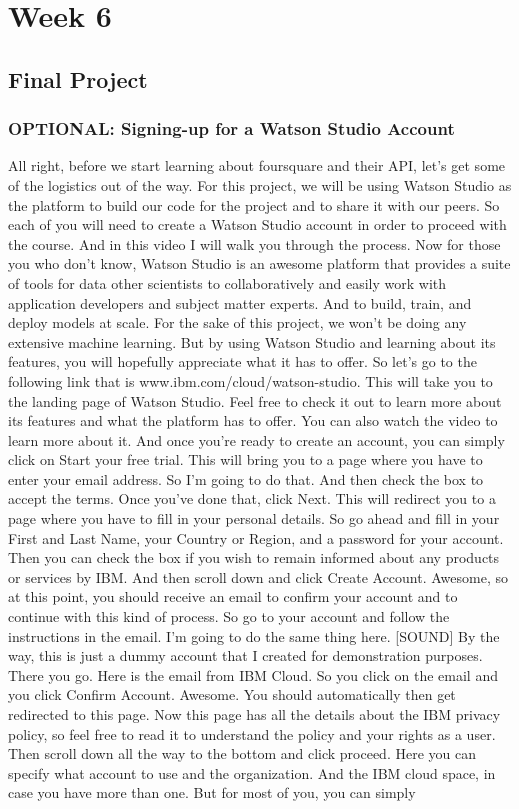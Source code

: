 \chapter{Week 6}

\section{Final Project}

	\subsection{OPTIONAL: Signing-up for a Watson Studio Account}
	
	
	All right, before we start learning about foursquare and their API, let's get some of the logistics out of the way. For this project, we will be using Watson Studio as the platform to build our code for the project and to share it with our peers. So each of you will need to create a Watson Studio account in order to proceed with the course. And in this video I will walk you through the process. Now for those you who don't know, Watson Studio is an awesome platform that provides a suite of tools for data other scientists to collaboratively and easily work with application developers and subject matter experts. And to build, train, and deploy models at scale. For the sake of this project, we won't be doing any extensive machine learning. But by using Watson Studio and learning about its features, you will hopefully appreciate what it has to offer. So let's go to the following link that is www.ibm.com/cloud/watson-studio. This will take you to the landing page of Watson Studio. Feel free to check it out to learn more about its features and what the platform has to offer. You can also watch the video to learn more about it. And once you're ready to create an account, you can simply click on Start your free trial. This will bring you to a page where you have to enter your email address. So I'm going to do that. And then check the box to accept the terms. Once you've done that, click Next. This will redirect you to a page where you have to fill in your personal details. So go ahead and fill in your First and Last Name, your Country or Region, and a password for your account. Then you can check the box if you wish to remain informed about any products or services by IBM. And then scroll down and click Create Account. Awesome, so at this point, you should receive an email to confirm your account and to continue with this kind of process. So go to your account and follow the instructions in the email. I'm going to do the same thing here. [SOUND] By the way, this is just a dummy account that I created for demonstration purposes. There you go. Here is the email from IBM Cloud. So you click on the email and you click Confirm Account. Awesome. You should automatically then get redirected to this page. Now this page has all the details about the IBM privacy policy, so feel free to read it to understand the policy and your rights as a user. Then scroll down all the way to the bottom and click proceed. Here you can specify what account to use and the organization. And the IBM cloud space, in case you have more than one. But for most of you, you can simply 